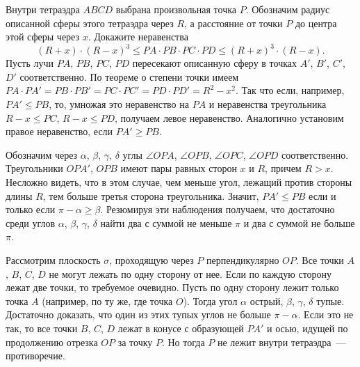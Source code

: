 \problem
Внутри тетраэдра $ABCD$ выбрана произвольная точка $P$.
Обозначим радиус описанной сферы этого тетраэдра через $R$, а расстояние от
точки $P$ до центра этой сферы через $x$.
Докажите неравенства
\[
    (R + x) \cdot (R - x)^3
\leq
    PA \cdot PB \cdot PC \cdot PD
\leq
    (R + x)^3 \cdot (R - x)
.\]
\solution
Пусть лучи $PA$, $PB$, $PC$, $PD$ пересекают описанную сферу в точках
$A'$, $B'$, $C'$, $D'$ соответственно.
По теореме о степени точки имеем
$PA \cdot PA' = PB \cdot PB' = PC \cdot PC' = PD \cdot PD' = R^2 - x^2$.
Так что если, например, $PA' \leq PB$, то, умножая это неравенство на $PA$ и
неравенства треугольника $R - x \leq PC$, $R - x \leq PD$, получаем левое
неравенство.
Аналогично установим правое неравенство, если $PA' \geq PB$.
\par
Обозначим через $\alpha$, $\beta$, $\gamma$, $\delta$ углы
$\angle OPA$, $\angle OPB$, $\angle OPC$, $\angle OPD$ соответственно.
Треугольники $OPA'$, $OPB$ имеют пары равных сторон $x$ и $R$, причем $R > x$.
Несложно видеть, что в этом случае, чем меньше угол, лежащий против стороны
длины $R$, тем больше третья сторона треугольника.
Значит, $PA' \leq PB$ если и только если $\pi - \alpha \geq \beta$.
Резюмируя эти наблюдения получаем, что достаточно среди углов
$\alpha$, $\beta$, $\gamma$, $\delta$ найти два с суммой не меньше $\pi$ и два
с суммой не больше $\pi$.
\par
Рассмотрим плоскость $\sigma$, проходящую через $P$ перпендикулярно $OP$.
Все точки $A$, $B$, $C$, $D$ не могут лежать по одну сторону от нее.
Если по каждую сторону лежат две точки, то требуемое очевидно.
Пусть по одну сторону лежит только точка $A$
(например, по ту же, где точка $O$).
Тогда угол  $\alpha$ острый, $\beta$, $\gamma$, $\delta$ тупые.
Достаточно доказать, что один из этих тупых углов не больше $\pi - \alpha$.
Если это не так, то все точки $B$, $C$, $D$ лежат в конусе с образующей $PA'$
и осью, идущей по продолжению отрезка $OP$ за точку $P$.
Но тогда $P$ не лежит внутри тетраэдра~--- противоречие.
\endproblem
